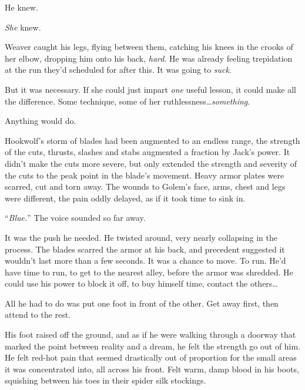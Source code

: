 He knew.



\emph{She} knew.



Weaver caught his legs, flying between them, catching his knees in the crooks of her elbow, dropping him onto his back, \emph{hard}.  He was already feeling trepidation at the run they'd scheduled for after this.  It was going to \emph{suck}.



But it was necessary.  If she could just impart \emph{one }useful lesson, it could make all the difference.  Some technique, some of her ruthlessness\ldots \emph{something}.



Anything would do.



\blacksquare



Hookwolf's storm of blades had been augmented to an endless range, the strength of the cuts, thrusts, slashes and stabs augmented a fraction by Jack's power.  It didn't make the cuts more severe, but only extended the strength and severity of the cuts to the peak point in the blade's movement.  Heavy armor plates were scarred, cut and torn away.  The wounds to Golem's face, arms, chest and legs were different, the pain oddly delayed, as if it took time to sink in.



``\emph{Blue.}''  The voice sounded so far away.



It was the push he needed.  He twisted around, very nearly collapsing in the process.  The blades scarred the armor at his back, and precedent suggested it wouldn't last more than a few seconds.  It was a chance to move.  To run.  He'd have time to run, to get to the nearest alley, before the armor was shredded.  He could use his power to block it off, to buy himself time, contact the others\ldots



All he had to do was put one foot in front of the other.  Get away first, then attend to the rest.



His foot raised off the ground, and as if he were walking through a doorway that marked the point between reality and a dream, he felt the strength go out of him.  He felt red-hot pain that seemed drastically out of proportion for the small areas it was concentrated into, all across his front.  Felt warm, damp blood in his boots, squishing between his toes in their spider silk stockings.



